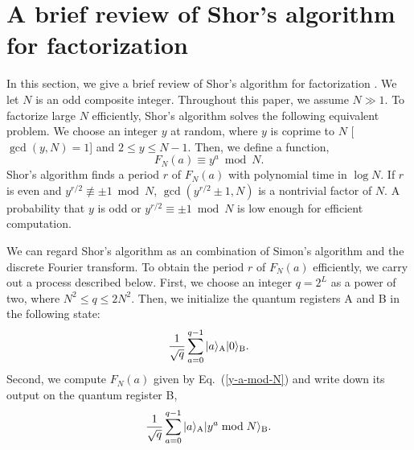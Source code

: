 \documentclass[12pt]{article}
\begin{document}
\section{\label{section-review-Shor}A brief review of Shor's algorithm for factorization}
In this section,
we give a brief review of Shor's algorithm for factorization
\cite{Shor1997,Ekert1996}.
We let $N$ is an odd composite integer.
Throughout this paper, we assume $N\gg 1$.
To factorize large $N$ efficiently,
Shor's algorithm solves the following equivalent problem.
We choose an integer $y$ at random,
where $y$ is coprime to $N$
[$\gcd(y,N)=1$]
and $2\leq y\leq N-1$.
Then,
we define a function,
\begin{equation}
F_{N}(a)\equiv y^{a} \bmod N.
\label{y-a-mod-N}
\end{equation}
Shor's algorithm finds a period $r$ of $F_{N}(a)$
with polynomial time in $\log N$.
If $r$ is even and
$y^{r/2}\not\equiv\pm 1 \bmod N$,
$\gcd(y^{r/2}\pm 1,N)$
is a nontrivial factor of $N$.
A probability that $y$ is odd or
$y^{r/2}\equiv\pm 1 \bmod N$
is low enough for efficient computation.

We can regard Shor's algorithm as an combination of Simon's algorithm and the discrete Fourier transform.
To obtain the period $r$ of $F_{N}(a)$ efficiently,
we carry out a process described below.
First, we choose an integer $q=2^{L}$ as a power of two,
where $N^{2}\leq q\leq 2N^{2}$.
Then,
we initialize the quantum registers A and B in the following state:
\begin{equation}
\frac{1}{\sqrt{q}}
\sum_{a=0}^{q-1}
|a\rangle_{\mbox{\scriptsize A}}
|0\rangle_{\mbox{\scriptsize B}}.
\label{Shor-1st-step}
\end{equation}
Second,
we compute $F_{N}(a)$ given by Eq.~(\ref{y-a-mod-N}) and write down its output on the quantum register B,
\begin{equation}
\frac{1}{\sqrt{q}}
\sum_{a=0}^{q-1}
|a\rangle_{\mbox{\scriptsize A}}
|y^{a} \bmod N\rangle_{\mbox{\scriptsize B}}.
\label{Shor-2nd-step}
\end{equation}
\end{document}
